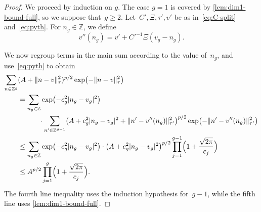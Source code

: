 \documentclass[12pt,oneside]{amsart}
\numberwithin{equation}{section}
\theoremstyle{definition}
\newcommand{\Z}{\mathbb{Z}}
\DeclarePairedDelimiter{\abs}{|}{|}
\DeclarePairedDelimiter{\paren}{(}{)}
\DeclarePairedDelimiter{\norm}{\|}{\|}
\begin{document}
\begin{proof}
  We proceed by induction on $g$. The case $g=1$ is covered by
  \cref{lem:dim1-bound-full}, so we suppose that~$g\geq
  2$. Let~$C',\Xi,\tau',v'$ be as in~\eqref{eq:C-split}
  and~\eqref{eq:pyth}. For $n_g\in \Z$, we define
  \begin{displaymath}
    v''(n_g) = v' + C'^{-1}\Xi(v_g - n_g).
  \end{displaymath}

  We now regroup terms in the main sum according to the value of~$n_{g}$, and
  use~\eqref{eq:pyth} to obtain
  \begin{displaymath}
    \begin{aligned}
      \sum_{n\in \Z^g} &(A + \norm{n-v}_\tau^2)^{p/2} \exp\paren[\big]{-\norm{n-v}_\tau^2}\\
      &= \sum_{n_{g}\in \Z} \exp \paren[\big]{-c_{g}^2\abs{n_{g}-v_{g}}^2}\\
      &\qquad\quad \cdot
        \sum_{n'\in \Z^{g-1}} \paren[\big]{A + c_{g}^2 \abs{n_{g} - v_{g}}^2 + \norm{n' - v''(n_g)}_{\tau'}^2}^{p/2}
        \exp\paren[\big]{-\norm{n' - v''(n_g)}_{\tau'}^2}\\
      &\leq \sum_{n_{g}\in \Z} \exp \paren[\big]{-c_{g}^2 \abs{n_{g}-v_{g}}^2} \cdot
        \paren[\big]{A + c_{g}^2 \abs{n_{g} - v_{g}}^2}^{p/2}
        \prod_{j=1}^{g-1} \paren[\Big]{1 + \frac{\sqrt{2\pi}}{c_j}}\\
      &\leq A^{p/2} \prod_{j=1}^{g} \paren[\Big]{1 + \frac{\sqrt{2\pi}}{c_j}}.
    \end{aligned}
  \end{displaymath}
  The fourth line inequality uses the induction hypothesis for~$g-1$, while the
  fifth line uses \cref{lem:dim1-bound-full}.
\end{proof}
\end{document}
